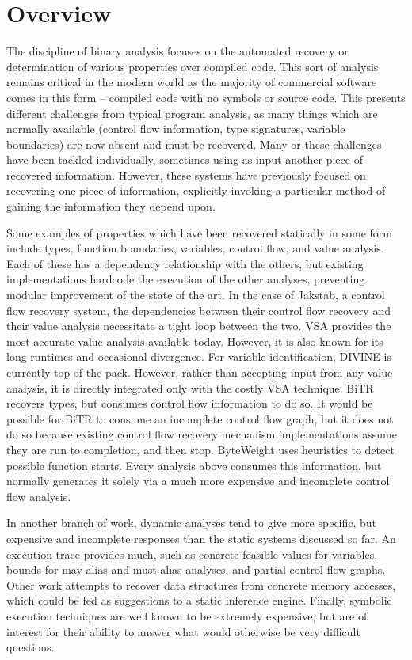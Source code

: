 
\section{Overview}
The discipline of binary analysis focuses on the automated recovery or determination of various properties over compiled code.
This sort of analysis remains critical in the modern world as the majority of commercial software comes in this form -- compiled code with no symbols or source code.
This presents different challenges from typical program analysis, as many things which are normally available (control flow information, type signatures, variable boundaries) are now absent and must be recovered.
Many or these challenges have been tackled individually, sometimes using as input another piece of recovered information.
However, these systems have previously focused on recovering one piece of information, explicitly invoking a particular method of gaining the information they depend upon.

Some examples of properties which have been recovered statically in some form include types, function boundaries, variables, control flow, and value analysis.
Each of these has a dependency relationship with the others, but existing implementations hardcode the execution of the other analyses, preventing modular improvement of the state of the art.
In the case of Jakstab\cite{jakstab}, a control flow recovery system, the dependencies between their control flow recovery and their value analysis necessitate a tight loop between the two.
VSA\cite{vsa} provides the most accurate value analysis available today. However, it is also known for its long runtimes and occasional divergence.
For variable identification, DIVINE\cite{divine} is currently top of the pack. However, rather than accepting input from any value analysis, it is directly integrated only with the costly VSA technique.
BiTR\cite{bitr} recovers types, but consumes control flow information to do so.
It would be possible for BiTR to consume an incomplete control flow graph, but it does not do so because existing control flow recovery mechanism implementations assume they are run to completion, and then stop.
ByteWeight\cite{byteweight} uses heuristics to detect possible function starts.
Every analysis above consumes this information, but normally generates it solely via a much more expensive and incomplete control flow analysis.

In another branch of work, dynamic analyses tend to give more specific, but expensive and incomplete responses than the static systems discussed so far.
An execution trace provides much, such as concrete feasible values for variables, bounds for may-alias and must-alias analyses, and partial control flow graphs.
Other work attempts to recover data structures from concrete memory accesses, which could be fed as suggestions to a static inference engine.
Finally, symbolic execution techniques are well known to be extremely expensive, but are of interest for their ability to answer what would otherwise be very difficult questions\cite{mayhem}.

